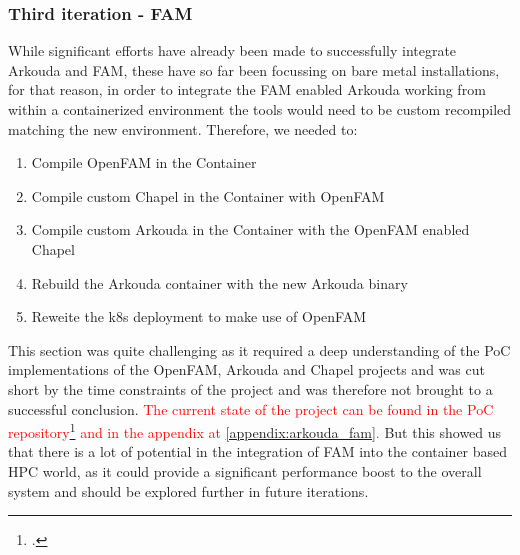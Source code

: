 \subsubsection{Third iteration - \ac{FAM}}
\label{third_iteration_fam}
While significant efforts have already been made to successfully integrate Arkouda and \ac{FAM}, these have so far been focussing on bare metal installations, for that reason, in order to integrate the \ac{FAM} enabled Arkouda working from within a containerized environment the tools would need to be 
custom recompiled matching the new environment. 
Therefore, we needed to:

\begin{enumerate}
    \item Compile OpenFAM in the Container
    \item Compile custom Chapel in the Container with OpenFAM
    \item Compile custom Arkouda in the Container with the OpenFAM enabled Chapel
    \item Rebuild the Arkouda container with the new Arkouda binary
    \item Reweite the \ac{k8s} deployment to make use of OpenFAM
\end{enumerate}

This section was quite challenging as it required a deep understanding of the \ac{PoC} implementations of the OpenFAM, Arkouda and Chapel projects and was cut short by the time constraints of the project and was therefore not brought to a successful conclusion.
\textcolor{red}{The current state of the project can be found in the \ac{PoC} repository\footcite{eckerthPoCRepository2023} and in the appendix at \ref{appendix:arkouda_fam}. 
}
But this showed us that there is a lot of potential in the integration of \ac{FAM} into the container based \ac{HPC} world, as it could provide a significant performance boost to the overall system and should be explored further in future iterations.

